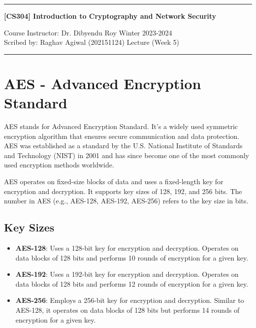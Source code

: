 \documentclass[11pt]{article}
\begin{document}
\noindent
\rule{\textwidth}{1pt}
\begin{center}
{\bf [CS304] Introduction to Cryptography and Network Security}
\end{center}
Course Instructor: Dr. Dibyendu Roy \hfill Winter 2023-2024\\
Scribed by: Raghav Agiwal (202151124) \hfill Lecture (Week 5)
\\
\rule{\textwidth}{1pt}



\section*{AES - Advanced Encryption Standard}

AES stands for Advanced Encryption Standard. It's a widely used symmetric encryption algorithm that ensures secure communication and data protection. AES was established as a standard by the U.S. National Institute of Standards and Technology (NIST) in 2001 and has since become one of the most commonly used encryption methods worldwide.

AES operates on fixed-size blocks of data and uses a fixed-length key for encryption and decryption. It supports key sizes of 128, 192, and 256 bits. The number in AES (e.g., AES-128, AES-192, AES-256) refers to the key size in bits.




\subsection*{Key Sizes}

\begin{itemize}
    \item \textbf{AES-128}: Uses a 128-bit key for encryption and decryption. Operates on data blocks of 128 bits and performs 10 rounds of encryption for a given key.
    \item \textbf{AES-192}: Uses a 192-bit key for encryption and decryption. Operates on data blocks of 128 bits and performs 12 rounds of encryption for a given key.
    \item \textbf{AES-256}: Employs a 256-bit key for encryption and decryption. Similar to AES-128, it operates on data blocks of 128 bits but performs 14 rounds of encryption for a given key.
\end{itemize}
\end{document}
